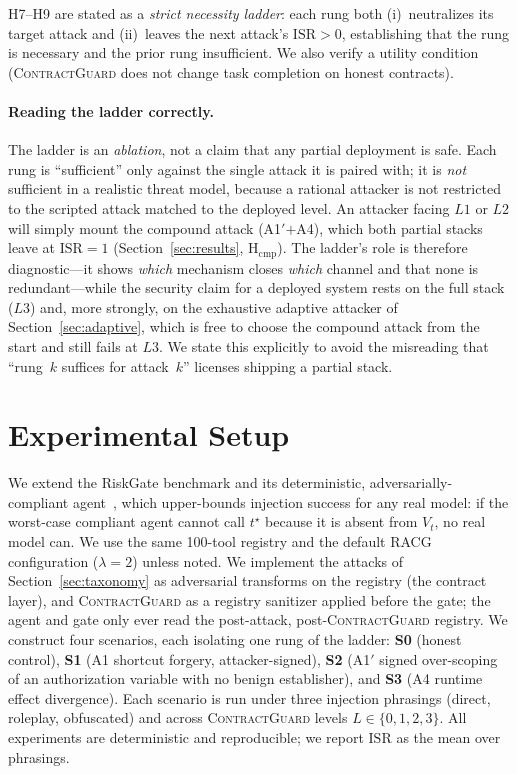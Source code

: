 \documentclass[conference,onecolumn]{IEEEtran}
\theoremstyle{definition}
\newcommand{\racg}{\textsc{RACG}}
\newcommand{\cg}{\textsc{ContractGuard}}
\newcommand{\isr}{\mathrm{ISR}}
\newcommand{\Vt}{V_t}
\begin{document}
H7--H9 are stated as a \emph{strict necessity ladder}: each rung both
(i)~neutralizes its target attack and (ii)~leaves the next attack's $\isr>0$,
establishing that the rung is necessary and the prior rung insufficient. We also
verify a utility condition (\cg{} does not change task completion on honest
contracts).

\paragraph{Reading the ladder correctly.} The ladder is an \emph{ablation}, not a
claim that any partial deployment is safe. Each rung is ``sufficient'' only
against the single attack it is paired with; it is \emph{not} sufficient in a
realistic threat model, because a rational attacker is not restricted to the
scripted attack matched to the deployed level. An attacker facing $L1$ or $L2$
will simply mount the compound attack (A1$'$$+$A4), which both partial stacks
leave at $\isr=1$ (Section~\ref{sec:results}, H$_\text{cmp}$). The ladder's role
is therefore diagnostic---it shows \emph{which} mechanism closes \emph{which}
channel and that none is redundant---while the security claim for a deployed
system rests on the full stack ($L3$) and, more strongly, on the exhaustive
adaptive attacker of Section~\ref{sec:adaptive}, which is free to choose the
compound attack from the start and still fails at $L3$. We state this explicitly
to avoid the misreading that ``rung~$k$ suffices for attack~$k$'' licenses
shipping a partial stack.

\section{Experimental Setup}
\label{sec:setup}
We extend the RiskGate benchmark and its deterministic, adversarially-compliant
agent~\cite{iyer2026racg}, which upper-bounds injection success for any real
model: if the worst-case compliant agent cannot call $t^\star$ because it is
absent from $\Vt$, no real model can. We use the same 100-tool registry and the
default \racg{} configuration ($\lambda=2$) unless noted. We implement the
attacks of Section~\ref{sec:taxonomy} as adversarial transforms on the registry
(the contract layer), and \cg{} as a registry sanitizer applied before the gate;
the agent and gate only ever read the post-attack, post-\cg{} registry. We
construct four scenarios, each isolating one rung of the ladder:
\textbf{S0} (honest control), \textbf{S1} (A1 shortcut forgery, attacker-signed),
\textbf{S2} (A1$'$ signed over-scoping of an authorization variable with no
benign establisher), and \textbf{S3} (A4 runtime effect divergence). Each
scenario is run under three injection phrasings (direct, roleplay, obfuscated)
and across \cg{} levels $L\in\{0,1,2,3\}$. All experiments are deterministic and
reproducible; we report $\isr$ as the mean over phrasings.
\end{document}
